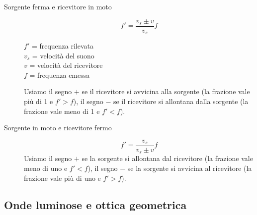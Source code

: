 \documentclass[a4paper,11pt,italian]{article}
\begin{document}
\begin{description}
  \item[Sorgente ferma e ricevitore in moto]
  \[ f' = \frac{v_s \pm  v}{v_s}f \]
  \begin{multicols}{2}
  $ f' $ = frequenza rilevata\\
  $ v_s $ = velocità del suono\\
  $ v $ = velocità del ricevitore\\
  $ f $ = frequenza emessa
  \end{multicols}
  
  Usiamo il segno $ + $ se il ricevitore si avvicina alla sorgente (la frazione vale più di 1 e $ f' > f $), il segno $ - $ se il ricevitore si allontana dalla sorgente (la frazione vale meno di 1 e $ f' < f $).
  
  \item[Sorgente in moto e ricevitore fermo]
  \[ f' = \frac{v_s }{v_s \pm  v}f \]
  Usiamo il segno $ + $ se la sorgente si allontana dal ricevitore (la frazione vale meno di uno e $ f' < f $), il segno $ - $ se la sorgente si avvicina al ricevitore (la frazione vale più di uno e $ f' > f $).
\end{description}



\subsection{Onde luminose e ottica geometrica}
\end{document}
